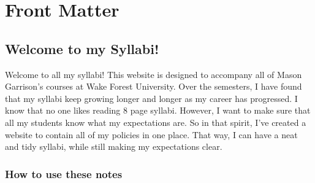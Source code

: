 \endgroup

\cleardoublepage
{} %

\cleardoublepage %




\hypertarget{part-front-matter}{%
\part*{Front Matter}\label{part-front-matter}}


\hypertarget{welcome-to-my-syllabi}{%
\chapter*{Welcome to my Syllabi!}\label{welcome-to-my-syllabi}}


Welcome to all my syllabi! This website is designed to accompany all of Mason Garrison's courses at Wake Forest University. Over the semesters, I have found that my syllabi keep growing longer and longer as my career has progressed.
I know that no one likes reading 8 page syllabi. However, I want to make sure that all my students know what my expectations are. So in that spirit, I've created a website to contain all of my policies in one place.
That way, I can have a neat and tidy syllabi, while still making my expectations clear.

\hypertarget{how-to-use-these-notes}{%
\section*{How to use these notes}\label{how-to-use-these-notes}}


